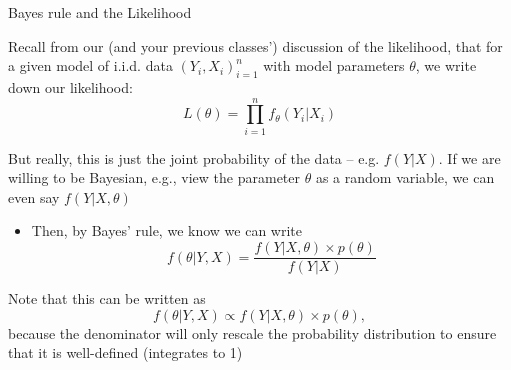 \documentclass[notes,11pt, aspectratio=169]{beamer}
\newenvironment{wideitemize}{\itemize\addtolength{\itemsep}{10pt}}{\enditemize}
\begin{document}
\begin{frame}{Bayes rule and the Likelihood}
  \begin{wideitemize}
  \item Recall from our (and your previous classes') discussion of the
    likelihood, that for a given model of i.i.d. data $(Y_{i},X_{i})_{i=1}^{n}$ with model parameters $\theta$, we write down our likelihood:
    \begin{equation*}
      L(\theta) = \prod_{i=1}^{n}f_{\theta}(Y_{i} | X_{i}) 
    \end{equation*}
  \item But really, this is just the joint probability of the data -- e.g. $f(Y | X)$. If we are willing to be Bayesian, e.g., view the parameter $\theta$ as a random variable, we can even say $f(Y | X, \theta)$
    \begin{itemize}
    \item Then, by Bayes' rule, we know we can write
      \begin{equation*}
        f(\theta | Y, X) = \frac{f(Y | X, \theta) \times p(\theta)}{f(Y|X)}
      \end{equation*}
    \end{itemize}
    \item Note that this can be written as
      \begin{equation*}
        f(\theta | Y, X) \propto f(Y | X, \theta) \times p(\theta),
      \end{equation*}
      because the denominator will only rescale the probability
      distribution to ensure that it is well-defined (integrates to 1)
  \end{wideitemize}
\end{frame}
\end{document}
